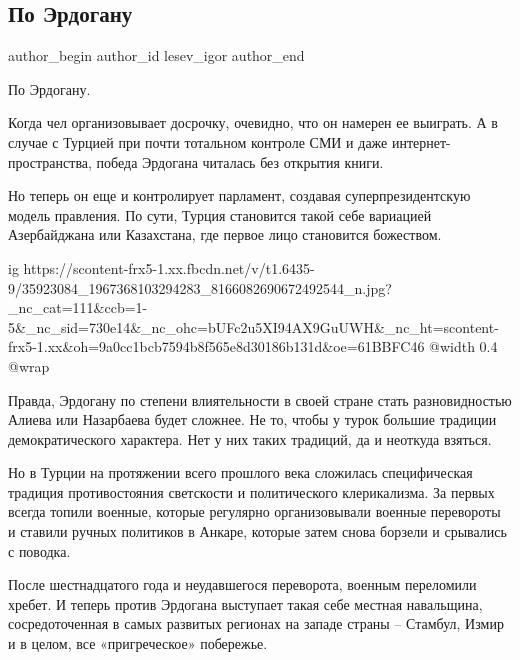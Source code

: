  
 
 
 
 
 
\subsection{По Эрдогану}
\label{sec:25_06_2018.fb.lesev_igor.1.po_erdoganu}
 
\ifcmt
 author_begin
   author_id lesev_igor
 author_end
\fi

По Эрдогану.

Когда чел организовывает досрочку, очевидно, что он намерен ее выиграть. А в
случае с Турцией при почти тотальном контроле СМИ и даже интернет-пространства,
победа Эрдогана читалась без открытия книги.

Но теперь он еще и контролирует парламент, создавая суперпрезидентскую модель
правления. По сути, Турция становится такой себе вариацией Азербайджана или
Казахстана, где первое лицо становится божеством.

\ifcmt
  ig https://scontent-frx5-1.xx.fbcdn.net/v/t1.6435-9/35923084_1967368103294283_8166082690672492544_n.jpg?_nc_cat=111&ccb=1-5&_nc_sid=730e14&_nc_ohc=bUFc2u5XI94AX9GuUWH&_nc_ht=scontent-frx5-1.xx&oh=9a0cc1bcb7594b8f565e8d30186b131d&oe=61BBFC46
  @width 0.4
  @wrap 
\fi

Правда, Эрдогану по степени влиятельности в своей стране стать разновидностью
Алиева или Назарбаева будет сложнее. Не то, чтобы у турок большие традиции
демократического характера. Нет у них таких традиций, да и неоткуда взяться.

Но в Турции на протяжении всего прошлого века сложилась специфическая традиция
противостояния светскости и политического клерикализма. За первых всегда топили
военные, которые регулярно организовывали военные перевороты и ставили ручных
политиков в Анкаре, которые затем снова борзели и срывались с поводка.

После шестнадцатого года и неудавшегося переворота, военным переломили хребет.
И теперь против Эрдогана выступает такая себе местная навальщина,
сосредоточенная в самых развитых регионах на западе страны – Стамбул, Измир и в
целом, все «пригреческое» побережье.

